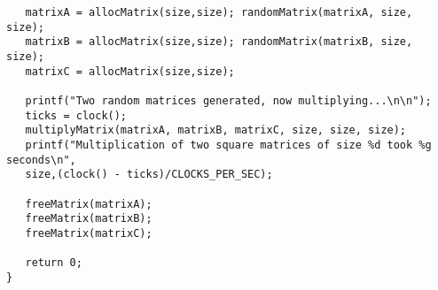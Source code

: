 \documentclass[a4paper,12pt]{article}
\begin{document}
\begin{enumerate}
\begin{small}
\begin{verbatim}
   matrixA = allocMatrix(size,size); randomMatrix(matrixA, size, size);
   matrixB = allocMatrix(size,size); randomMatrix(matrixB, size, size);
   matrixC = allocMatrix(size,size);

   printf("Two random matrices generated, now multiplying...\n\n");
   ticks = clock();
   multiplyMatrix(matrixA, matrixB, matrixC, size, size, size);
   printf("Multiplication of two square matrices of size %d took %g seconds\n",
   size,(clock() - ticks)/CLOCKS_PER_SEC);

   freeMatrix(matrixA);
   freeMatrix(matrixB);
   freeMatrix(matrixC);

   return 0;
}
\end{verbatim}
\end{small}
\end{enumerate}
\end{document}
